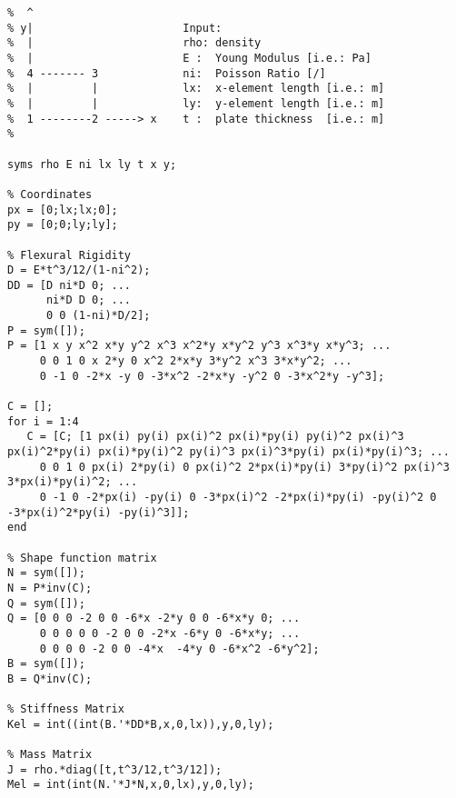 \begin{scriptsize}
\begin{lstlisting}[frame=single] 
%
%  ^
% y|                       Input:
%  |                       rho: density
%  |                       E :  Young Modulus [i.e.: Pa]
%  4 ------- 3             ni:  Poisson Ratio [/]
%  |         |             lx:  x-element length [i.e.: m]
%  |         |             ly:  y-element length [i.e.: m]
%  1 --------2 -----> x    t :  plate thickness  [i.e.: m]
%

syms rho E ni lx ly t x y;

% Coordinates
px = [0;lx;lx;0];
py = [0;0;ly;ly];

% Flexural Rigidity
D = E*t^3/12/(1-ni^2); 
DD = [D ni*D 0; ...
      ni*D D 0; ...
      0 0 (1-ni)*D/2];
P = sym([]);
P = [1 x y x^2 x*y y^2 x^3 x^2*y x*y^2 y^3 x^3*y x*y^3; ...
     0 0 1 0 x 2*y 0 x^2 2*x*y 3*y^2 x^3 3*x*y^2; ...
     0 -1 0 -2*x -y 0 -3*x^2 -2*x*y -y^2 0 -3*x^2*y -y^3];

C = [];
for i = 1:4
   C = [C; [1 px(i) py(i) px(i)^2 px(i)*py(i) py(i)^2 px(i)^3 px(i)^2*py(i) px(i)*py(i)^2 py(i)^3 px(i)^3*py(i) px(i)*py(i)^3; ...
     0 0 1 0 px(i) 2*py(i) 0 px(i)^2 2*px(i)*py(i) 3*py(i)^2 px(i)^3 3*px(i)*py(i)^2; ...
     0 -1 0 -2*px(i) -py(i) 0 -3*px(i)^2 -2*px(i)*py(i) -py(i)^2 0 -3*px(i)^2*py(i) -py(i)^3]];
end

% Shape function matrix
N = sym([]);
N = P*inv(C);
Q = sym([]);
Q = [0 0 0 -2 0 0 -6*x -2*y 0 0 -6*x*y 0; ...
     0 0 0 0 0 -2 0 0 -2*x -6*y 0 -6*x*y; ...
     0 0 0 0 -2 0 0 -4*x  -4*y 0 -6*x^2 -6*y^2];
B = sym([]);
B = Q*inv(C);

% Stiffness Matrix
Kel = int((int(B.'*DD*B,x,0,lx)),y,0,ly);

% Mass Matrix
J = rho.*diag([t,t^3/12,t^3/12]);
Mel = int(int(N.'*J*N,x,0,lx),y,0,ly);
\end{lstlisting}
\end{scriptsize}
\newpage
\thispagestyle{empty}
